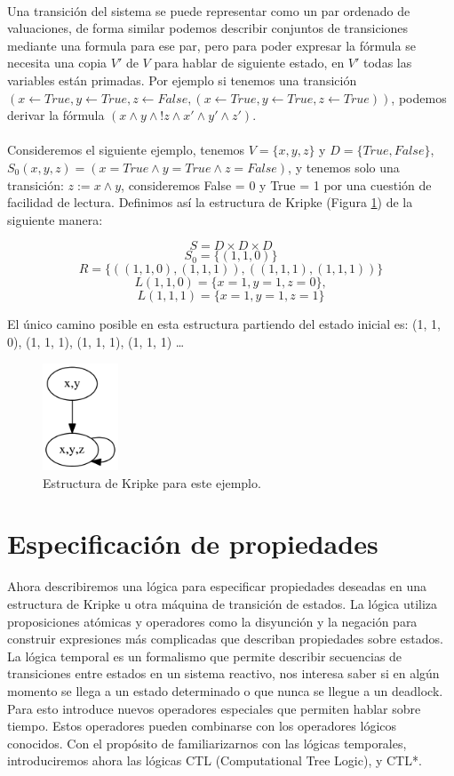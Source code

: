 \\
Una transición del sistema se puede representar como un par ordenado de valuaciones, de forma similar podemos describir conjuntos de transiciones mediante una formula para ese par, pero para poder expresar la fórmula se necesita una copia $V'$ de $V$ para hablar de siguiente estado, en $V'$ todas las variables están primadas. Por ejemplo si tenemos una transición $(x \gets True, y \gets True, z \gets False,(x \gets True, y \gets True, z \gets True))$, podemos derivar la fórmula $(x \land y \land !z \land x' \land y' \land z')$.\\
\\
Consideremos el siguiente ejemplo, tenemos $V = \{x,y,z\}$ y $D = \{True, False\}$, $S_{0} (x,y,z) = (x= True \land y = True \land z = False)$, y tenemos solo una transición: $z := x \land y$, consideremos False = 0 y True = 1 por una cuestión de facilidad de lectura. Definimos así la estructura de Kripke (Figura \ref{fig:kripke1})  de la siguiente manera:

\[S = D \times D \times D\]
\[S_{0} = \{(1, 1, 0)\}\]
\[R = \{((1, 1, 0), (1, 1, 1)), ((1, 1, 1), (1, 1, 1))\}\]
\[L (1, 1, 0) = \{x = 1, y = 1, z = 0\},\]
\[L (1, 1, 1) = \{x = 1, y = 1, z = 1\}\]

El único camino posible en esta estructura partiendo del estado inicial es: (1, 1, 0), (1, 1, 1), (1, 1, 1), (1, 1, 1) …

\begin{figure}[h!]
  \centering
  \includegraphics[width=0.2\textwidth]{Figures/kripke.png}
  \caption{Estructura de Kripke para este ejemplo.}
  \label{fig:kripke1}
\end{figure}

\section{Especificación de propiedades}

Ahora describiremos una lógica para especificar propiedades deseadas en una estructura de Kripke u otra máquina de transición de estados. La lógica utiliza proposiciones atómicas y operadores como la disyunción y la negación para construir expresiones más complicadas que describan propiedades sobre estados.
La lógica temporal es un formalismo que permite describir secuencias de transiciones entre estados en un sistema reactivo, nos interesa saber si en algún momento se llega a un estado determinado o que nunca se llegue a un deadlock. Para esto introduce nuevos operadores especiales que permiten hablar sobre tiempo. Estos operadores pueden combinarse con los operadores lógicos conocidos.
Con el propósito de familiarizarnos con las lógicas temporales, introduciremos ahora las lógicas CTL (Computational Tree Logic), y CTL*. 

